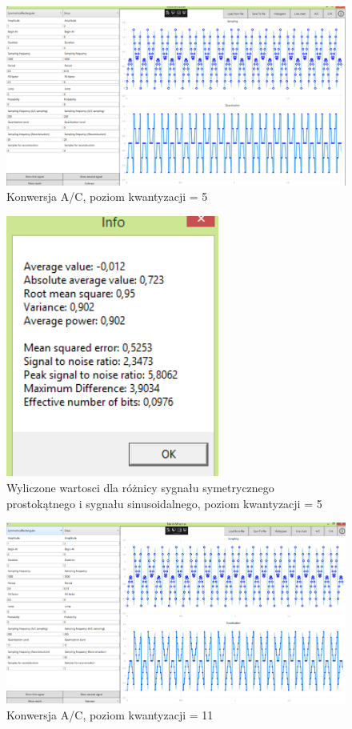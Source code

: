 \documentclass[12pt]{article}
\begin{document}
\begin{figure}[H]
 \centering
 \includegraphics[width=14cm]{images/addac.PNG}
 \vspace{-0.3cm}
 \caption{Konwersja A/C, poziom kwantyzacji = 5}
 \label{gui}
\end{figure}

\begin{figure}[H]
 \centering
 \includegraphics[width=7cm]{images/addinfo.PNG}
 \vspace{-0.3cm}
 \caption{Wyliczone wartosci dla różnicy sygnału symetrycznego prostokątnego i sygnału sinusoidalnego, poziom kwantyzacji = 5}
 \label{gui}
\end{figure}

\begin{figure}[H]
 \centering
 \includegraphics[width=14cm]{images/addac1.PNG}
 \vspace{-0.3cm}
 \caption{Konwersja A/C, poziom kwantyzacji = 11}
 \label{gui}
\end{figure}
\end{document}
